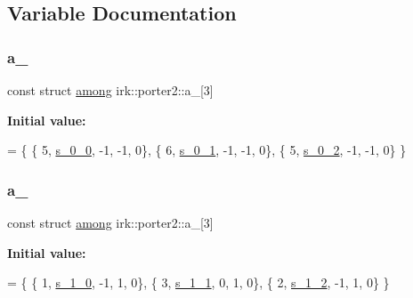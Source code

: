 \subsection{Variable Documentation}
\mbox{\label{namespaceirk_1_1porter2_aff642f7bbfc5bd013dbbdd8876527dbf}} 
\subsubsection{\texorpdfstring{a\+\_}{a\_0}}
{\footnotesize\ttfamily const struct \mbox{\hyperlink{structirk_1_1porter2_1_1among}{among}} irk\+::porter2\+::a\+\_\mbox{[}3\mbox{]}\hspace{0.3cm}{\ttfamily [static]}}

{\bfseries Initial value\+:}
\begin{DoxyCode}
=
\{
 \{ 5, \mbox{\hyperlink{namespaceirk_1_1porter2_a734d88004fa3116732f77cda8188a158}{s\_0\_0}}, -1, -1, 0\},
 \{ 6, \mbox{\hyperlink{namespaceirk_1_1porter2_a500fbb6a1584ec25e84ced156ea683a4}{s\_0\_1}}, -1, -1, 0\},
 \{ 5, \mbox{\hyperlink{namespaceirk_1_1porter2_a9cdc597d2cc6f5daa6d20e9e9ac982ee}{s\_0\_2}}, -1, -1, 0\}
\}
\end{DoxyCode}
\mbox{\label{namespaceirk_1_1porter2_a020efbbfd2a292a7ccaeb7858106b1d2}} 
\subsubsection{\texorpdfstring{a\+\_}{a\_1}}
{\footnotesize\ttfamily const struct \mbox{\hyperlink{structirk_1_1porter2_1_1among}{among}} irk\+::porter2\+::a\+\_\mbox{[}3\mbox{]}\hspace{0.3cm}{\ttfamily [static]}}

{\bfseries Initial value\+:}
\begin{DoxyCode}
=
\{
 \{ 1, \mbox{\hyperlink{namespaceirk_1_1porter2_a6d3d58138b401aaac7a0e63b8a9e00f1}{s\_1\_0}}, -1, 1, 0\},
 \{ 3, \mbox{\hyperlink{namespaceirk_1_1porter2_a3553fc5f140a6a3ab8c0245111958e60}{s\_1\_1}}, 0, 1, 0\},
 \{ 2, \mbox{\hyperlink{namespaceirk_1_1porter2_a01d1eb51a058173f4d63b30a90a76050}{s\_1\_2}}, -1, 1, 0\}
\}
\end{DoxyCode}
\mbox{\label{namespaceirk_1_1porter2_a1b3ab67c718be923bcf0dcb1d6c5c27f}} 
